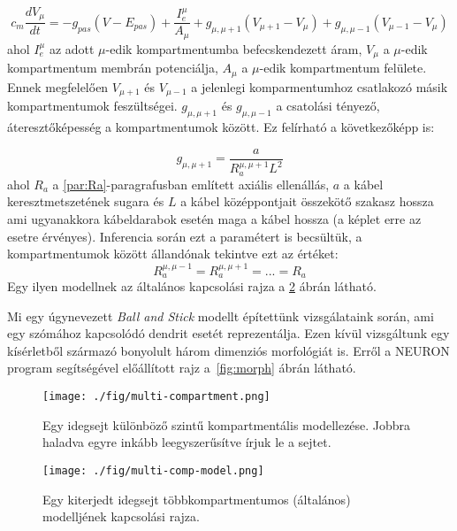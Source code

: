 \begin{equation}\label{eq:multi_comp}
	c_m\dfrac{dV_\mu}{dt} = -g_{pas}\left(V - E_{pas}\right) + \dfrac{I_e^\mu}{A_\mu} + g_{\mu,\mu+1}\left(V_{\mu+1}-V_\mu \right) + g_{\mu,\mu-1}\left(V_{\mu-1}-V_\mu \right)
\end{equation}
ahol $I_e^\mu$ az adott $\mu$-edik kompartmentumba befecskendezett áram, $V_\mu$ a $\mu$-edik kompartmentum membrán potenciálja, $A_\mu$ a $\mu$-edik kompartmentum felülete. Ennek megfelelően $V_{\mu+1}$ és $V_{\mu-1}$ a jelenlegi komparmentumhoz csatlakozó másik kompartmentumok feszültségei. $g_{\mu,\mu+1}$ és $g_{\mu,\mu-1}$ a csatolási tényező, áteresztőképesség a kompartmentumok között. Ez felírható a következőképp is:

\begin{equation}\label{eq:Ra}
	g_{\mu,\mu+1} = \dfrac{a}{R_a^{\mu,\mu+1} L^2}
\end{equation}
ahol $R_a$ a \ref{par:Ra}-paragrafusban említett axiális ellenállás, $a$ a kábel keresztmetszetének sugara és $L$ a kábel középpontjait összekötő szakasz hossza ami ugyanakkora kábeldarabok esetén maga a kábel hossza (a képlet erre az esetre érvényes). Inferencia során ezt a paramétert is becsültük, a kompartmentumok között állandónak tekintve ezt az értéket: 
\[ R_a^{\mu,\mu-1} = R_a^{\mu,\mu+1} = ... = R_a \]
Egy ilyen modellnek az általános kapcsolási rajza a \ref{fig:multi_comp_model} ábrán látható. 

Mi egy úgynevezett \textit{Ball and Stick} modellt építettünk vizsgálataink során, ami egy szómához kapcsolódó dendrit esetét reprezentálja. Ezen kívül vizsgáltunk egy kísérletből származó bonyolult három dimenziós morfológiát is. Erről a NEURON program segítségével előállított rajz a~\ref{fig:morph} ábrán látható.


\begin{figure}[!htb]
	\centering
	\texttt{[image: ./fig/multi-compartment.png]}
	\caption[Többkompartmentumos modellezés]{\cite{dayan2001theoretical} Egy idegsejt különböző szintű kompartmentális modellezése. Jobbra haladva egyre inkább leegyszerűsítve írjuk le a sejtet.}
	\label{fig:multi_comp}
\end{figure}

\begin{figure}[!htb]
	\centering
	\texttt{[image: ./fig/multi-comp-model.png]}
	\caption[Többkompartmentumos modell]{\cite{dayan2001theoretical} Egy kiterjedt idegsejt többkompartmentumos (általános) modelljének kapcsolási rajza.}
	\label{fig:multi_comp_model}
\end{figure}

